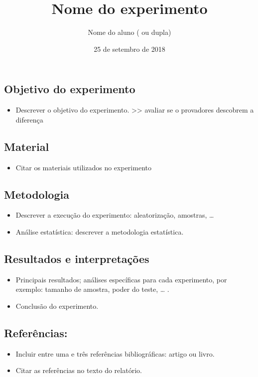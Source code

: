 \documentclass[]{article}
\title{Nome do experimento}
\author{Nome do aluno ( ou dupla)}
\date{25 de setembro de 2018}
\providecommand{\tightlist}{%
  \setlength{\itemsep}{0pt}\setlength{\parskip}{0pt}}
\begin{document}
\maketitle

\subsection{Objetivo do experimento}\label{objetivo-do-experimento}

\begin{itemize}
\tightlist
\item
  Descrever o objetivo do experimento. \textgreater{}\textgreater{}
  avaliar se o provadores descobrem a diferença
\end{itemize}

\subsection{Material}\label{material}

\begin{itemize}
\tightlist
\item
  Citar os materiais utilizados no experimento
\end{itemize}

\subsection{Metodologia}\label{metodologia}

\begin{itemize}
\item
  Descrever a execução do experimento: aleatorização, amostras, \ldots{}
\item
  Análise estatística: descrever a metodologia estatística.
\end{itemize}

\subsection{Resultados e
interpretações}\label{resultados-e-interpretacoes}

\begin{itemize}
\item
  Principais resultados; análises específicas para cada experimento, por
  exemplo: tamanho de amostra, poder do teste, \ldots{} .
\item
  Conclusão do experimento.
\end{itemize}

\subsection{Referências:}\label{referencias}

\begin{itemize}
\item
  Incluir entre uma e três referências bibliográficas: artigo ou livro.
\item
  Citar as referências no texto do relatório.
\end{itemize}
\end{document}
